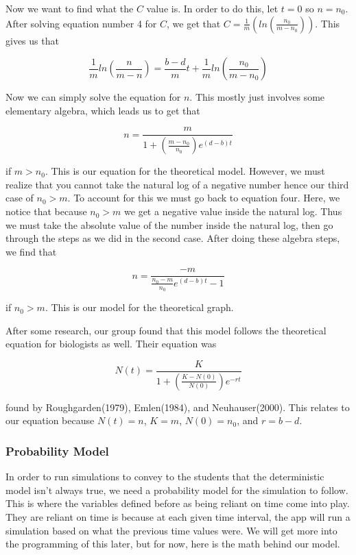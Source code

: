 \documentclass{article}\usepackage[]{graphicx}\usepackage[]{color}
\begin{document}
Now we want to find what the \(C\) value is. In order to do this, let \(t=0\) so \(n=n_0\). After solving equation number 4 for \(C\), we get that \(C = \frac{1}{m}(ln(\frac{n_0}{m-n_0}))\). This gives us that 

\begin{equation}
\frac{1}{m} ln(\frac{n}{m-n}) = \frac{b-d}{m}t + \frac{1}{m}ln(\frac{n_0}{m-n_0})
\end{equation}

Now we can simply solve the equation for \(n\). This mostly just involves some elementary algebra, which leads us to get that 

\begin{equation}
n = \frac{m}{1+(\frac{m-n_0}{n_0})e^{(d-b)t}}
\end{equation}

if \(m > n_0\). This is our equation for the theoretical model. However, we must realize that you cannot take the natural log of a negative number hence our third case of \(n_0 >m\). To account for this we must go back to equation four. Here, we notice that because \(n_0 > m\) we get a negative value inside the natural log. Thus we must take the absolute value of the number inside the natural log, then go through the steps as we did in the second case. After doing these algebra steps, we find that 

\begin{equation}
n= \frac{-m}{\frac{n_0-m}{n_0}e^{(d-b)t}-1}
\end{equation}

if \(n_0 > m\). This is our model for the theoretical graph. 

After some research, our group found that this model follows the theoretical equation for biologists as well. Their equation was 

\begin{equation}
N(t) = \frac{K}{1+(\frac{K-N(0)}{N(0)})e^{-rt}}
\end{equation}

found by Roughgarden(1979), Emlen(1984), and Neuhauser(2000). This relates to our equation because \(N(t) = n\), \(K=m\), \(N(0)=n_0\), and \(r = b-d\).

\subsubsection{Probability Model}

In order to run simulations to convey to the students that the deterministic model isn't always true, we need a probability model for the simulation to follow. This is where the variables defined before as being reliant on time come into play. They are reliant on time is because at each given time interval, the app will run a simulation based on what the previous time values were. We will get more into the programming of this later, but for now, here is the math behind our model.
\end{document}
